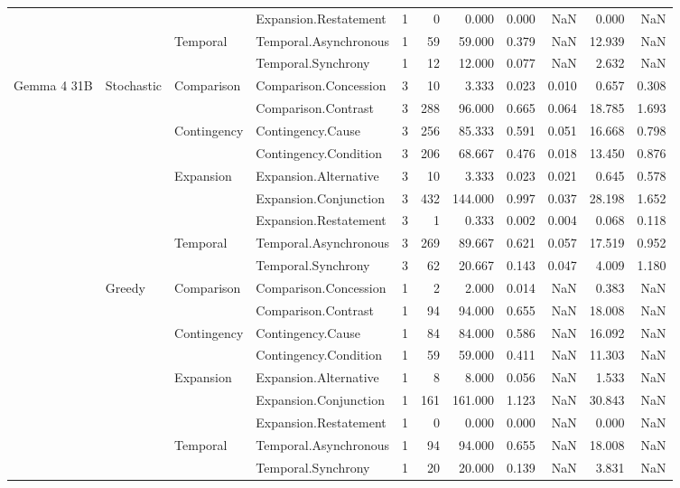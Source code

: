 \begin{table}
\begin{tabular}{llllrrrrrrr}
 &  &  & Expansion.Restatement & 1 & 0 & 0.000 & 0.000 & NaN & 0.000 & NaN \\
\cline{3-11}
 &  & \multirow[t]{2}{*}{Temporal} & Temporal.Asynchronous & 1 & 59 & 59.000 & 0.379 & NaN & 12.939 & NaN \\
 &  &  & Temporal.Synchrony & 1 & 12 & 12.000 & 0.077 & NaN & 2.632 & NaN \\
\cline{1-11} \cline{2-11} \cline{3-11}
\multirow[t]{18}{*}{Gemma 4 31B} & \multirow[t]{9}{*}{Stochastic} & \multirow[t]{2}{*}{Comparison} & Comparison.Concession & 3 & 10 & 3.333 & 0.023 & 0.010 & 0.657 & 0.308 \\
 &  &  & Comparison.Contrast & 3 & 288 & 96.000 & 0.665 & 0.064 & 18.785 & 1.693 \\
\cline{3-11}
 &  & \multirow[t]{2}{*}{Contingency} & Contingency.Cause & 3 & 256 & 85.333 & 0.591 & 0.051 & 16.668 & 0.798 \\
 &  &  & Contingency.Condition & 3 & 206 & 68.667 & 0.476 & 0.018 & 13.450 & 0.876 \\
\cline{3-11}
 &  & \multirow[t]{3}{*}{Expansion} & Expansion.Alternative & 3 & 10 & 3.333 & 0.023 & 0.021 & 0.645 & 0.578 \\
 &  &  & Expansion.Conjunction & 3 & 432 & 144.000 & 0.997 & 0.037 & 28.198 & 1.652 \\
 &  &  & Expansion.Restatement & 3 & 1 & 0.333 & 0.002 & 0.004 & 0.068 & 0.118 \\
\cline{3-11}
 &  & \multirow[t]{2}{*}{Temporal} & Temporal.Asynchronous & 3 & 269 & 89.667 & 0.621 & 0.057 & 17.519 & 0.952 \\
 &  &  & Temporal.Synchrony & 3 & 62 & 20.667 & 0.143 & 0.047 & 4.009 & 1.180 \\
\cline{2-11} \cline{3-11}
 & \multirow[t]{9}{*}{Greedy} & \multirow[t]{2}{*}{Comparison} & Comparison.Concession & 1 & 2 & 2.000 & 0.014 & NaN & 0.383 & NaN \\
 &  &  & Comparison.Contrast & 1 & 94 & 94.000 & 0.655 & NaN & 18.008 & NaN \\
\cline{3-11}
 &  & \multirow[t]{2}{*}{Contingency} & Contingency.Cause & 1 & 84 & 84.000 & 0.586 & NaN & 16.092 & NaN \\
 &  &  & Contingency.Condition & 1 & 59 & 59.000 & 0.411 & NaN & 11.303 & NaN \\
\cline{3-11}
 &  & \multirow[t]{3}{*}{Expansion} & Expansion.Alternative & 1 & 8 & 8.000 & 0.056 & NaN & 1.533 & NaN \\
 &  &  & Expansion.Conjunction & 1 & 161 & 161.000 & 1.123 & NaN & 30.843 & NaN \\
 &  &  & Expansion.Restatement & 1 & 0 & 0.000 & 0.000 & NaN & 0.000 & NaN \\
\cline{3-11}
 &  & \multirow[t]{2}{*}{Temporal} & Temporal.Asynchronous & 1 & 94 & 94.000 & 0.655 & NaN & 18.008 & NaN \\
 &  &  & Temporal.Synchrony & 1 & 20 & 20.000 & 0.139 & NaN & 3.831 & NaN \\
\cline{1-11} \cline{2-11} \cline{3-11}
\bottomrule
\end{tabular}
\end{table}
